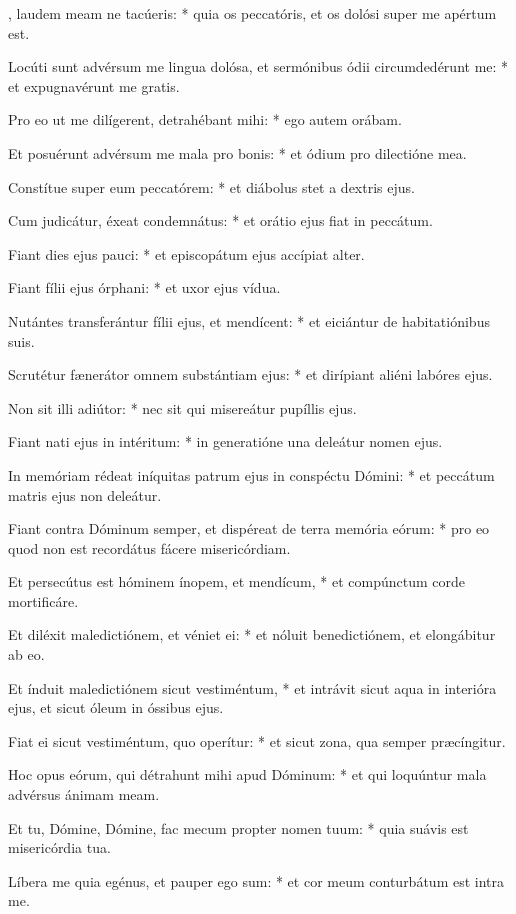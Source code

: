 \begin{psalmus}

, laudem meam ne tacúeris: * quia os peccatóris, et os dolósi super me apértum est.

Locúti sunt advérsum me lingua dolósa, et sermónibus ódii circumdedérunt me: * et expugnavérunt me gratis.

Pro eo ut me dilígerent, detrahébant mihi: * ego autem orábam.

Et posuérunt advérsum me mala pro bonis: * et ódium pro dilectióne mea.

Constítue super eum peccatórem: * et diábolus stet a dextris ejus.

Cum judicátur, éxeat condemnátus: * et orátio ejus fiat in peccátum.

Fiant dies ejus pauci: * et episcopátum ejus accípiat alter.

Fiant fílii ejus órphani: * et uxor ejus vídua.

Nutántes transferántur fílii ejus, et mendícent: * et eiciántur de habitatiónibus suis.

Scrutétur fænerátor omnem substántiam ejus: * et dirípiant aliéni labóres ejus.

Non sit illi adiútor: * nec sit qui misereátur pupíllis ejus.

Fiant nati ejus in intéritum: * in generatióne una deleátur nomen ejus.

In memóriam rédeat iníquitas patrum ejus in conspéctu Dómini: * et peccátum matris ejus non deleátur.

Fiant contra Dóminum semper, et dispéreat de terra memória eórum: * pro eo quod non est recordátus fácere misericórdiam.

Et persecútus est hóminem ínopem, et mendícum, * et compúnctum corde mortificáre.

Et diléxit maledictiónem, et véniet ei: * et nóluit benedictiónem, et elongábitur ab eo.

Et índuit maledictiónem sicut vestiméntum, * et intrávit sicut aqua in interióra ejus, et sicut óleum in óssibus ejus.

Fiat ei sicut vestiméntum, quo operítur: * et sicut zona, qua semper præcíngitur.

Hoc opus eórum, qui détrahunt mihi apud Dóminum: * et qui loquúntur mala advérsus ánimam meam.

Et tu, Dómine, Dómine, fac mecum propter nomen tuum: * quia suávis est misericórdia tua.

Líbera me quia egénus, et pauper ego sum: * et cor meum conturbátum est intra me.


\end{psalmus}

